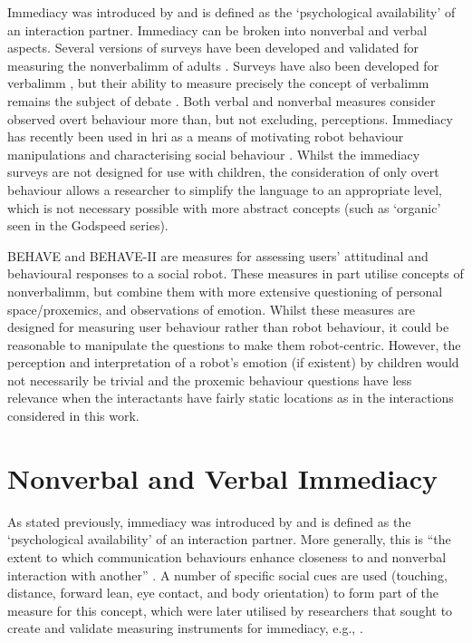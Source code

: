 Immediacy was introduced by \cite{mehrabian1968some} and is defined as the `psychological availability' of an interaction partner. Immediacy can be broken into nonverbal and verbal aspects. Several versions of surveys have been developed and validated for measuring the \gls{nonverbalimm} of adults \citep{richmond2003development}. Surveys have also been developed for \gls{verbalimm} \citep{gorham1988relationship}, but their ability to measure precisely the concept of \gls{verbalimm} remains the subject of debate \citep{robinson1995validity}. Both verbal and nonverbal measures consider observed overt behaviour more than, but not excluding, perceptions. Immediacy has recently been used in \acrshort{hri} as a means of motivating robot behaviour manipulations \citep{szafir2012pay} and characterising social behaviour \citep{kennedy2015higher}. Whilst the \gls{immediacy} surveys are not designed for use with children, the consideration of only overt behaviour allows a researcher to simplify the language to an appropriate level, which is not necessary possible with more abstract concepts (such as `organic' seen in the Godspeed series).

BEHAVE \citep{joosse2011behave} and BEHAVE-II \citep{joosse2013behave} are measures for assessing users' attitudinal and behavioural responses to a social robot. These measures in part utilise concepts of \gls{nonverbalimm}, but combine them with more extensive questioning of personal space/proxemics, and observations of emotion. Whilst these measures are designed for measuring user behaviour rather than robot behaviour, it could be reasonable to manipulate the questions to make them robot-centric. However, the perception and interpretation of a robot's emotion (if existent) by children would not necessarily be trivial and the proxemic behaviour questions have less relevance when the interactants have fairly static locations as in the interactions considered in this work.

\section{Nonverbal and Verbal Immediacy} \label{sec:lit-immediacy}
As stated previously, immediacy was introduced by \citet{mehrabian1968some} and is defined as the `psychological availability' of an interaction partner. More generally, this is ``the extent to which communication behaviours enhance closeness to and nonverbal interaction with another'' \citep{mehrabian1968some}. A number of specific social cues are used (touching, distance, forward lean, eye contact, and body orientation) to form part of the measure for this concept, which were later utilised by researchers that sought to create and validate measuring instruments for immediacy, e.g., \citet{richmond2003development}. 

